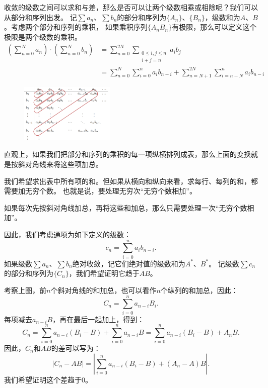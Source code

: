 \documentclass[12pt,UTF8]{ctexbook}
\theoremstyle{definition}
\theoremstyle{plain}
\begin{document}
收敛的级数之间可以求和与差，那么是否可以让两个级数相乘或相除呢？我们可以从部分和序列出发。
记$\sum a_n$、$\sum b_n$的部分和序列为$\{A_n\}$、$\{B_n\}$，级数和为$A$、$B$。考虑两个部分和序列的乘积，
如果乘积序列$\{A_nB_n\}$有极限，那么可以定义这个极限是两个级数的乘积。
\begin{align*}
    \left(\sum_{n=0}^{N} a_n \right) \cdot \left(\sum_{n=0}^{N} b_n \right) &= \sum_{n=0}^{2N} \sum_{\substack{0\leqslant i,j \leqslant n \\ i+j=n}} a_i b_j \\
    &= \sum_{n=0}^{N} \sum_{i=0}^n a_i b_{n-i} + \sum_{n=N+1}^{2N} \sum_{i=n-N}^n a_i b_{n-i}
\end{align*}

\begin{figure} %
    \vspace{-32pt}
    \flushright
    \includegraphics[width=0.4\textwidth]{tu/级数乘积.png}
\end{figure}

直观上，如果我们把部分和序列的乘积的每一项纵横排列成表，那么上面的变换就是按斜对角线来将这些项加总。

我们希望求出表中所有项的和。但如果从横向和纵向来看，求每行、每列的和，都需要加无穷个数。
也就是说，要处理无穷次“无穷个数相加”。

如果每次先按斜对角线加总，再将这些和加总，那么只需要处理一次“无穷个数相加”。

因此，我们考虑通项为如下定义的级数：
$$ c_n = \sum_{i=0}^n a_i b_{n-i} . $$
如果级数$\sum a_n$、$\sum b_n$绝对收敛，记它们绝对值的级数和为$A^*$、$B^*$。
记级数$\sum c_n$的部分和序列为$\{C_n\}$，我们希望证明它趋于$AB$。

考察上图，前$n$个斜对角线的和加总，也可以看作$n$个纵列的和加总，因此：
$$C_n = \sum_{i=0}^{n} a_{n-i} B_i. $$
每项减去$a_{n-i}B$，再在最后一起加上，得到：
$$ C_n = \sum_{i=0}^{n} a_{n-i} (B_i - B) + \sum_{i=0}^n a_{n-i} B = \sum_{i=0}^{n} a_{n-i} (B_i - B) + A_n B. $$
因此，$C_n$和$AB$的差可以写为：
$$ |C_n - AB| = \left|\sum_{i=0}^{n} a_{n-i} (B_i - B) + (A_n - A) B \right|. $$
我们希望证明这个差趋于$0$。
\end{document}

